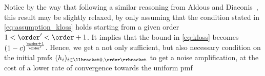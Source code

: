 Notice by the way that following a similar reasoning from Aldous and Diaconis~\cite[Thm.~3]{aldous_shuffling_1986}, this result may be slightly relaxed, by only assuming that the condition stated in \autoref{eq:assumption_kloss} holds starting from a given order \(1 < \order' < \order+1\).
It implies that the bound in \autoref{eq:kloss} becomes \((1-c)^{\frac{\order+1}{\order'}}\).
Hence, we get a not only sufficient, but also necessary condition on the initial \glspl{pmf} \((h_i)_{i \in \llbracket 0, \order \rrbracket}\) to get a noise amplification, at the cost of a lower rate of convergence towards the uniform \gls{pmf}